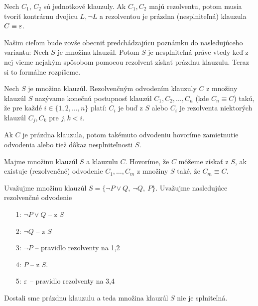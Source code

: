 \begin{poznamka}
    Nech $C_1$, $C_2$ sú jednotkové klauzuly. Ak $C_1,C_2$ majú
    rezolventu, potom musia tvoriť kontrárnu dvojicu $L, \neg L$
    a rezolventou je prázdna (nesplniteľná) klauzula $C \equiv \varepsilon$.
\end{poznamka}

Našim cieľom bude zovše obecniť predchádzajúcu poznámku do
nasledujúceho variantu: Nech $S$ je množina klauzúl. Potom $S$ je
nesplniteľná práve vtedy keď z nej vieme nejakým spôsobom pomocou
rezolvent získať prázdnu klauzulu.
Teraz si to formálne rozpíšeme.

\begin{definicia}
    Nech $S$ je množina klauzúl.
    Rezolvenčným odvodením klauzuly $C$ z množiny klauzúl $S$
    nazývame konečnú postupnosť klauzúl $C_1, C_2, \ldots, C_n$ 
    (kde $C_n \equiv C$) takú,
    že pre každé $i \in \{1,2,\dots,n\}$ platí:
    $C_i$ je buď z $S$ alebo $C_i$ je rezolventa niektorých klauzúl
    $C_j, C_k$ pre $j, k < i$.

    Ak $C$ je prázdna klauzula, potom takémuto odvodeniu hovoríme 
    zamietnutie odvodenia alebo tiež dôkaz nesplniteľnosti $S$.
\end{definicia}

\begin{definicia}
    Majme množinu klauzúl $S$ a klauzulu $C$.
    Hovoríme, že $C$ môžeme získať z $S$,
    ak existuje (rezolvenčné) odvodenie $C_1, \dots, C_m$ z množiny $S$ také, že
    $C_m \equiv C$.
\end{definicia}

\begin{priklad}
    Uvažujme množinu klauzúl $S=\{\neg P \lor Q,\ \neg Q,\ P\}$.
    Uvažujme nasledujúce rezolvenčné odvodenie
    \begin{itemize} 
	\item[1:] $ \neg P \lor Q $  -- z $S$
	\item[2:] $ \neg Q $ -- z $S$
	\item[3:] $ \neg P $ -- pravidlo rezolventy na 1,2
	\item[4:] $ P $ -- z $S$.
        \item[5:] $\varepsilon$ -- pravidlo rezolventy na 3,4
    \end{itemize}
    Dostali sme prázdnu klauzulu a teda množina klauzúl $S$ nie je
    splniteľná.
\end{priklad}

